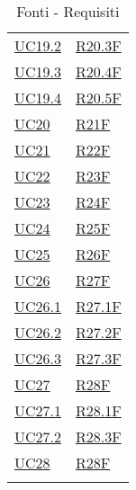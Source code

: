 \begin{center}
\begin{longtable}[!h]{m{50px} m{50px}}
        \hyperref[sec:UC19.2]{UC19.2}     & \hyperref[tab:RequisitiFunzionali]{R20.3F} \\
        \hyperref[sec:UC19.3]{UC19.3}     & \hyperref[tab:RequisitiFunzionali]{R20.4F} \\
        \hyperref[sec:UC19.4]{UC19.4}     & \hyperref[tab:RequisitiFunzionali]{R20.5F} \\
        \hyperref[sec:UC20]{UC20}         & \hyperref[tab:RequisitiFunzionali]{R21F}   \\
        \hyperref[sec:UC21]{UC21}         & \hyperref[tab:RequisitiFunzionali]{R22F}   \\
        \hyperref[sec:UC22]{UC22}         & \hyperref[tab:RequisitiFunzionali]{R23F}   \\
        \hyperref[sec:UC23]{UC23}         & \hyperref[tab:RequisitiFunzionali]{R24F}   \\
        \hyperref[sec:UC24]{UC24}         & \hyperref[tab:RequisitiFunzionali]{R25F}   \\
        \hyperref[sec:UC25]{UC25}         & \hyperref[tab:RequisitiFunzionali]{R26F}   \\
        \hyperref[sec:UC26]{UC26}         & \hyperref[tab:RequisitiFunzionali]{R27F}   \\
        \hyperref[sec:UC26.1]{UC26.1}     & \hyperref[tab:RequisitiFunzionali]{R27.1F} \\
        \hyperref[sec:UC26.2]{UC26.2}     & \hyperref[tab:RequisitiFunzionali]{R27.2F} \\
        \hyperref[sec:UC26.3]{UC26.3}     & \hyperref[tab:RequisitiFunzionali]{R27.3F} \\
        \hyperref[sec:UC27]{UC27}         & \hyperref[tab:RequisitiFunzionali]{R28F}   \\
        \hyperref[sec:UC27.1]{UC27.1}     & \hyperref[tab:RequisitiFunzionali]{R28.1F} \\
        \hyperref[sec:UC27.2]{UC27.2}     & \hyperref[tab:RequisitiFunzionali]{R28.3F} \\
        \hyperref[sec:UC28]{UC28}         & \hyperref[tab:RequisitiFunzionali]{R28F}   \\



        \rowcolor{white}\caption{Fonti - Requisiti}
    \end{longtable}
\end{center}
